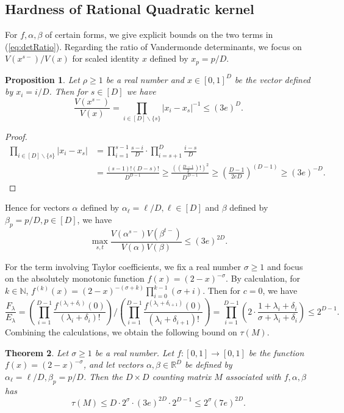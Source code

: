 \documentclass[10pt,a4paper]{article}
\newtheorem{theorem}{Theorem}
\newtheorem{proposition}[theorem]{Proposition}
\theoremstyle{remark}
\numberwithin{equation}{section}
\numberwithin{theorem}{section}
\newcommand{\N}{\ensuremath{\mathbb{N}}}
\newcommand{\R}{\ensuremath{\mathbb{R}}}
\begin{document}
\subsection{Hardness of Rational Quadratic kernel}
For $f, \alpha, \beta$ of certain forms, we give explicit bounds on the two terms in (\ref{eq:detRatio}). Regarding the ratio of Vandermonde determinants, we focus on $V(x^{s-})/V(x)$ for scaled identity $x$ defined by $x_p = p/D$.
\begin{proposition}
Let $\rho \ge 1$ be a real number and $x \in [0, 1]^D$ be the vector defined by $x_i = i/D$.
Then for $s \in [D]$ we have \[\frac{V(x^{s-})}{V(x)} = \prod_{i\in [D]\backslash \{s\}}|x_i - x_s|^{-1}
\le (3e)^{D}.\]
\end{proposition}
\begin{proof}
\begin{align*}
\prod_{i\in [D]\backslash \{s\}}|x_i - x_s| 
&=\prod_{i=1}^{s-1} \frac{s - i}{D}
\cdot \prod_{i=s+1}^D \frac{i - s}{D} \\
&= \frac{(s-1)!(D-s)!}{D^{D-1}}
\ge \frac{((\frac{D-1}2)!)^2}{D^{D-1}}
\ge \left(\frac{D-1}{2eD}\right)^{(D-1)}
\ge (3e)^{-D}.
\end{align*}
\end{proof}
Hence for vectors $\alpha$ defined by $\alpha_\ell = \ell/D, \ell\in [D]$ and $\beta$ defined by $\beta_p = p/D, p \in [D]$, we have
\[\max_{s, t} \frac{V(\alpha^{s-})V(\beta^{t-})}{V(\alpha)V(\beta)} \le (3e)^{2D}.\]

For the term involving Taylor coefficients, we fix a real number $\sigma \ge 1$ and focus on the absolutely monotonic function $f(x) = (2-x)^{-\sigma}$. By calculation, for $k \in \N$,
$f^{(k)}(x) = (2-x)^{-(\sigma + k)} \prod_{i=0}^{k-1}(\sigma + i)$.
Then for $c = 0$, we have
\[\frac{F_{\lambda}}{E_{\lambda}}
=\left(\prod_{i=1}^{D-1} 
\frac{f^{(\lambda_i + \delta_i)}(0)}{(\lambda_i + \delta_i)!}\right)
\bigg/\left(\prod_{i=1}^{D-1} 
\frac{f^{(\lambda_i + \delta_{i+1})}(0)}{(\lambda_i + \delta_{i+1})!}\right)
=\prod_{i=1}^{D-1}\left(2 \cdot \frac{1 + \lambda_i + \delta_i}{\sigma + \lambda_i + \delta_i}\right)
\le 2^{D-1}.\]
Combining the calculations, we obtain the following bound on $\tau(M)$.
\begin{theorem}
Let $\sigma \ge 1$ be a real number. 
Let $f:[0, 1] \rightarrow [0, 1]$ be the function $f(x) = (2-x)^{-\sigma}$, and let vectors $\alpha, \beta \in \R^D$ be defined by $\alpha_\ell = \ell/D, \beta_p = p/D$. Then the $D \times D$ counting matrix $M$ associated with $f, \alpha, \beta$ has
\[\tau(M) \le D \cdot 2^\sigma \cdot (3e)^{2D} \cdot 2^{D-1} \le 2^{\sigma}(7e)^{2D}.\]
\end{theorem}
\end{document}
